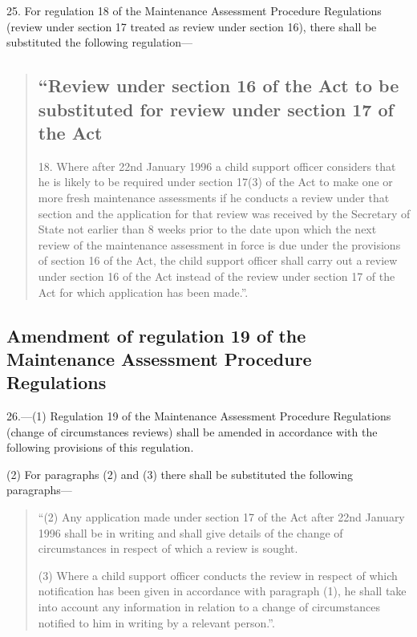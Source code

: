 \documentclass[a4paper]{article}
\begin{document}
25.  For regulation 18 of the Maintenance Assessment Procedure Regulations (review under section 17 treated as review under section 16), there shall be substituted the following regulation—
\begin{quotation}
\subsection*{“Review under section 16 of the Act to be substituted for review under section 17 of the Act}

18.  Where after 22nd January 1996 a child support officer considers that he is likely to be required under section 17(3) of the Act to make one or more fresh maintenance assessments if he conducts a review under that section and the application for that review was received by the Secretary of State not earlier than 8 weeks prior to the date upon which the next review of the maintenance assessment in force is due under the provisions of section 16 of the Act, the child support officer shall carry out a review under section 16 of the Act instead of the review under section 17 of the Act for which application has been made.”.
\end{quotation}

\subsection[26. Amendment of regulation 19 of the Maintenance Assessment Procedure Regulations]{Amendment of regulation 19 of the Maintenance Assessment Procedure Regulations}

26.—(1) Regulation 19 of the Maintenance Assessment Procedure Regulations (change of circumstances reviews) shall be amended in accordance with the following provisions of this regulation.

(2) For paragraphs (2) and (3) there shall be substituted the following paragraphs—
\begin{quotation}
“(2) Any application made under section 17 of the Act after 22nd January 1996 shall be in writing and shall give details of the change of circumstances in respect of which a review is sought.

(3) Where a child support officer conducts the review in respect of which notification has been given in accordance with paragraph (1), he shall take into account any information in relation to a change of circumstances notified to him in writing by a relevant person.”.
\end{quotation}
\end{document}
